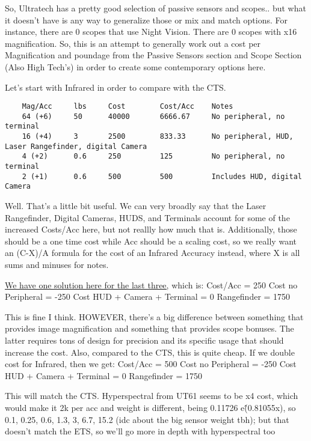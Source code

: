 \begin{multicols*}{2}
	So, Ultratech has a pretty good selection of passive sensors and scopes.. but what it doesn't have is any way to generalize those or mix and match options. For instance, there are 0 scopes that use Night Vision. There are 0 scopes with x16 magnification. So, this is an attempt to generally work out a cost per Magnification and poundage from the Passive Sensors section and Scope Section (Also High Tech's) in order to create some contemporary options here.
	
	Let's start with Infrared in order to compare with the CTS.
	
	\begin{verbatim}
	Mag/Acc		lbs		Cost		Cost/Acc	Notes
	64 (+6)		50		40000		6666.67		No peripheral, no terminal
	16 (+4)		3		2500		833.33		No peripheral, HUD, Laser Rangefinder, digital Camera
	4 (+2)		0.6		250			125			No peripheral, no terminal
	2 (+1)		0.6		500			500			Includes HUD, digital Camera
	\end{verbatim}	
	
	Well. That's a little bit useful. We can very broadly say that the Laser Rangefinder, Digital Cameras, HUDS, and Terminals account for some of the increased Costs/Acc here, but not reallly how much that is. Additionally, those should be a one time cost while Acc should be a scaling cost, so we really want an (C-X)/A formula for the cost of an Infrared Accuracy instead, where X is all sums and minuses for notes.
	
	\href{https://www.wolframalpha.com/input?i=2X+%2B+P+%3D+250+%3D+X+%2B+A+when+A+%3E%3D+0%2C+P+%3C%3D+0%2C+X+%3D+250}{We have one solution here for the last three,} which is:
	Cost/Acc = 250
	Cost no Peripheral = -250
	Cost HUD + Camera + Terminal = 0
	Rangefinder = 1750
	
	This is fine I think. HOWEVER, there's a big difference between something that provides image magnification and something that provides scope bonuses. The latter requires tons of design for precision and its specific usage that should increase the cost. Also, compared to the CTS, this is quite cheap. If we double cost for Infrared, then we get:
	Cost/Acc = 500
	Cost no Peripheral = -250
	Cost HUD + Camera + Terminal = 0
	Rangefinder = 1750
	
	This will match the CTS. Hyperspectral from UT61 seems to be x4 cost, which would make it 2k per acc and weight is different, being 0.11726 e\^(0.81055x), so 0.1, 0.25, 0.6, 1.3, 3, 6.7, 15.2 (idc about the big sensor weight tbh); but that doesn't match the ETS, so we'll go more in depth with hyperspectral too
	

\end{multicols*}
